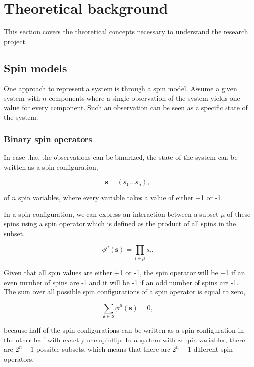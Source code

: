 \section{Theoretical background}

This section covers the theoretical concepts necessary to understand the research project.

\subsection{Spin models}

One approach to represent a system is through a spin model. Assume a given system with $n$ components where a single observation of the system yields one value for every component.
Such an observation can be seen as a specific state of the system.

\subsubsection{Binary spin operators}

In case that the observations can be binarized, the state of the system can be written as a spin configuration,

\begin{equation}
    \mathbf{s} = (s_1 \dots s_n),
\end{equation}

\noindent
of $n$ spin variables, where every variable takes a value of either +1 or -1.

\noindent
In a spin configuration, we can express an interaction between a subset $\mu$ of these spins using a spin operator which is defined as the product of all spins in the subset,

\begin{equation}\label{eq:spin_op}
    \phi^\mu(\mathbf{s}) = \prod_{i \in \mu} s_i.
\end{equation}

\noindent
Given that all spin values are either +1 or -1, the spin operator will be +1 if an even number of spins are -1 and it will be -1 if an odd number of spins are -1.
The sum over all possible spin configurations of a spin operator is equal to zero,

\begin{equation}\label{eq:sum_over_conf}
    \sum_{\mathbf{s} \in \mathbf{S}} \phi^\mu(\mathbf{s}) = 0,
\end{equation}

\noindent
because half of the spin configurations can be written as a spin configuration in the other half with exactly one spinflip.
In a system with $n$ spin variables, there are $2^n - 1$ possible subsets, which means that there are $2^n - 1$ different spin operators.

